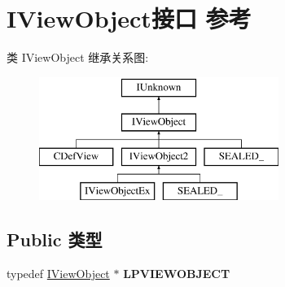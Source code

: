 \hypertarget{interface_i_view_object}{}\section{I\+View\+Object接口 参考}
\label{interface_i_view_object}
类 I\+View\+Object 继承关系图\+:\begin{figure}[H]
\begin{center}
\leavevmode
\includegraphics[height=4.000000cm]{interface_i_view_object}
\end{center}
\end{figure}
\subsection*{Public 类型}
\begin{DoxyCompactItemize}
\item 
\mbox{\label{interface_i_view_object_a2aa929b34ca0403ccc69358c271f4efd}} 
typedef \hyperlink{interface_i_view_object}{I\+View\+Object} $\ast$ {\bfseries L\+P\+V\+I\+E\+W\+O\+B\+J\+E\+CT}
\end{DoxyCompactItemize}

